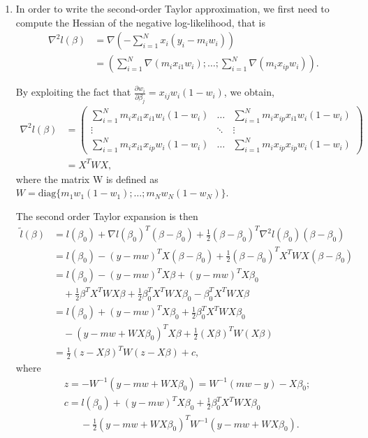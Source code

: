 \documentclass{homework}
\begin{document}
\begin{enumerate}[label=(\Alph*)]
\item In order to write the second-order Taylor approximation, we first need to compute the Hessian of the negative log-likelihood, that is
\begin{align*}
\nabla^2 l(\beta) &= \nabla \left( - \sum_{i=1}^N x_i (y_i - m_i w_i) \right)
\\
&= \left( \sum_{i=1}^N \nabla (m_i x_{i1} w_i); \dots ; \sum_{i=1}^N \nabla (m_i x_{ip} w_i) \right).
\end{align*}

By exploiting the fact that $\frac{\partial w_i}{\partial \beta_j} = x_{ij} w_i (1 - w_i)$, we obtain, 
\begin{align*}
\nabla^2 l(\beta) &= \left( \begin{array}{ccc}
\sum_{i=1}^N m_i x_{i1} x_{i1} w_i (1 - w_i) & \hdots & \sum_{i=1}^N m_i x_{ip} x_{i1} w_i (1 - w_i) \\ 
\vdots & \ddots & \vdots \\ 
\sum_{i=1}^N m_i x_{i1} x_{ip} w_i (1 - w_i) & \hdots & \sum_{i=1}^N m_i x_{ip} x_{ip} w_i (1 - w_i)
\end{array} 
\right)
\\
&= X^T W X, 
\end{align*}
where the matrix W is defined as $W = \text{diag} \{ m_1 w_1 (1-w_1); \dots ; m_N w_N (1-w_N) \}$. 

The second order Taylor expansion is then 
\begin{align*}
\tilde{l} (\beta) &= l (\beta_0) + \nabla l (\beta_0)^T (\beta - \beta_0) + \frac{1}{2} (\beta - \beta_0)^T \nabla^2 l (\beta_0) (\beta - \beta_0)
\\
&= l (\beta_0) - (y - m w)^T X (\beta - \beta_0) + \frac{1}{2} (\beta - \beta_0)^T X^T W X (\beta - \beta_0)
\\
&= l (\beta_0) - (y-mw)^T X \beta + (y - mw)^T X \beta_0 
\\
&\quad + \frac{1}{2} \beta^T X^T W X \beta + \frac{1}{2} \beta_0^T X^T W X \beta_0 - \beta_0^T X^T W X \beta
\\
&=l (\beta_0) + (y - mw)^T X \beta_0 + \frac{1}{2} \beta_0^T X^T W X \beta_0 
\\
&\quad - (y - mw + WX\beta_0)^T X \beta + \frac{1}{2} (X \beta)^T W (X \beta)
\\
&=\frac{1}{2} ( z - X \beta)^T W ( z - X \beta) + c,
\end{align*}
where 
\begin{align*}
&z = -W^{-1} (y - mw + WX \beta_0) = W^{-1}(mw - y) - X \beta_0;
\\
&c = l(\beta_0) + (y - mw)^T X \beta_0 + \frac{1}{2} \beta_0^T X^T W X \beta_0 
\\
&\quad \text{ } - \frac{1}{2} (y - mw + WX \beta_0)^T W^{-1} (y - mw + WX \beta_0).
\end{align*}


\end{enumerate}
\end{document}
